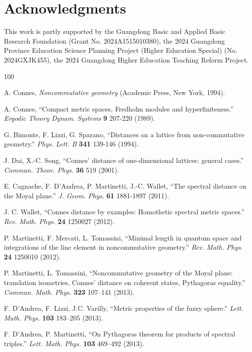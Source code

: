 \documentclass[a4paper,12pt]{article}
\begin{document}
\section*{Acknowledgments}
This work is partly supported by the
Guangdong Basic and Applied Basic Research Foundation (Grant No.
2024A1515010380), the 2024 Guangdong Province Education Science Planning
Project (Higher Education Special) (No. 2024GXJK455), the 2024 Guangdong
Higher Education Teaching Reform Project.



\begin{thebibliography}{100}

	A. Connes, \textit{Noncommutative geometry}
	(Academic Press, New York, 1994).
	
	A. Connes, ``Compact metric spaces, Fredholm modules and
	hyperfiniteness.'' \textit{Ergodic Theory Dynam. Systems}
	\textbf{9} 207-220 (1989).
	
	G. Bimonte, F. Lizzi, G. Sparano, ``Distances on a
	lattice from non-commutative geometry.'' \textit{Phys. Lett. B}
	\textbf{341} 139-146 (1994).
	
	J. Dai, X.-C. Song, ``Connes' distance of one-dimensional
	lattices: general cases.'' \textit{Commun. Theor. Phys.}
	\textbf{36} 519 (2001).
	
	E. Cagnache, F. D'Andrea, P. Martinetti, J.-C. Wallet,
	``The spectral distance on the Moyal plane.'' \textit{J. Geom.
				Phys.} \textbf{61} 1881-1897 (2011).
	
	J. C. Wallet, ``Connes distance by examples: Homothetic
	spectral metric spaces.'' \textit{Rev. Math. Phys.}
	\textbf{24} 1250027 (2012).
	
	P. Martinetti, F. Mercati, L. Tomassini, ``Minimal
	length in quantum space and integrations of the line element in
	noncommutative geometry.'' \textit{Rev. Math. Phys.}
	\textbf{24} 1250010 (2012).
	
	P. Martinetti, L. Tomassini, ``Noncommutative geometry
	of the Moyal plane: translation isometries, Connes' distance on coherent
	states, Pythagoras equality.'' \textit{Commun. Math. Phys.}
	\textbf{323} 107--141 (2013).
	
	F. D'Andrea, F. Lizzi, J.C. Varilly, ``Metric properties
	of the fuzzy sphere.'' \textit{Lett. Math. Phys.}
	\textbf{103} 183--205 (2013).
	
	F. D'Andrea, P. Martinetti, ``On Pythagoras theorem
	for products of spectral triples.'' \textit{Lett. Math. Phys.}
	\textbf{103} 469--492 (2013).
	

\end{thebibliography}
\end{document}
